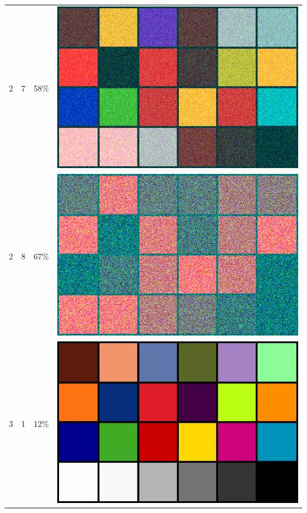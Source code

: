 \documentclass[times, utf8, seminar, numeric]{fer}
\begin{document}
\begin{center}
\begin{longtable}{|c|c|c|c|}
2 & 7 &58\% & \includegraphics[scale=0.3]{../benchmark_results/color_chart/2_components-7_bits.png} \\
2 & 8 &67\% & \includegraphics[scale=0.3]{../benchmark_results/color_chart/2_components-8_bits.png} \\
3 & 1 &12\% & \includegraphics[scale=0.3]{../benchmark_results/color_chart/3_components-1_bits.png} \\

\end{longtable}
\end{center}
\end{document}
